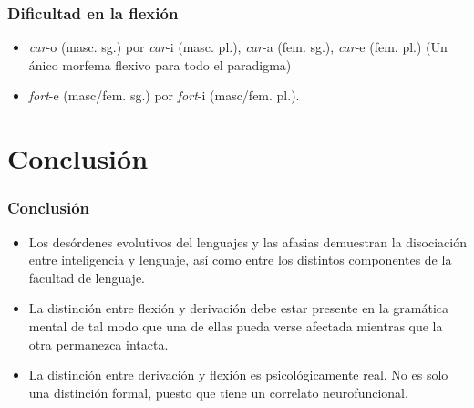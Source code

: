 \documentclass[compress]{beamer}
\begin{document}
	\begin{frame}
	\frametitle{Dificultad en la flexión}


	\begin{itemize}
	\item \emph{car}-\alert{o} (masc. sg.) por \emph{car}-\alert{i} (masc.
	pl.), \emph{car}-\alert{a} (fem. sg.), \emph{car}-\alert{e} (fem.
	pl.) (Un ánico morfema flexivo para todo el paradigma)
	\item \emph{fort}-\alert{e} (masc/fem. sg.) por \emph{fort}-\alert{i} (masc/fem. pl.).
	\end{itemize}

	\end{frame}

	\section{Conclusión}

	\begin{frame}
	\frametitle{Conclusión}
	\begin{itemize}
	\item Los desórdenes evolutivos del lenguajes y las afasias demuestran la disociación entre inteligencia y lenguaje, así como entre los distintos componentes de la facultad de lenguaje.  
	\item  La distinción entre flexión y derivación debe estar presente
	en la gramática mental de tal modo que una de ellas pueda verse
	afectada mientras que la otra permanezca intacta.
	  \item La distinción entre derivación y flexión es
	psicológicamente real. No es solo una distinción formal, puesto que
	tiene un correlato neurofuncional.
	\end{itemize}



	\end{frame}
    
\end{document}
